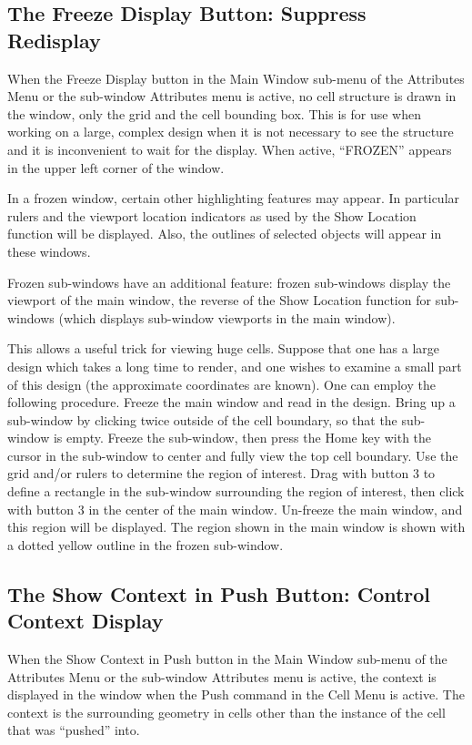 \subsection{The {\cb Freeze Display} Button: Suppress Redisplay}
When the {\cb Freeze Display} button in the {\cb Main Window} sub-menu
of the {\cb Attributes Menu} or the sub-window {\cb Attributes} menu is
active, no cell structure is drawn in the window, only the grid and
the cell bounding box.  This is for use when working on a large,
complex design when it is not necessary to see the structure and it is
inconvenient to wait for the display.  When active, ``FROZEN'' appears
in the upper left corner of the window.

In a frozen window, certain other highlighting features may appear. 
In particular rulers and the viewport location indicators as used by
the {\cb Show Location} function will be displayed.  Also, the
outlines of selected objects will appear in these windows.
    
Frozen sub-windows have an additional feature:  frozen sub-windows
display the viewport of the main window, the reverse of the {\cb Show
Location} function for sub-windows (which displays sub-window viewports
in the main window).

This allows a useful trick for viewing huge cells.  Suppose that one
has a large design which takes a long time to render, and one wishes
to examine a small part of this design (the approximate coordinates
are known).  One can employ the following procedure.  Freeze the main
window and read in the design.  Bring up a sub-window by clicking twice
outside of the cell boundary, so that the sub-window is empty.  Freeze
the sub-window, then press the {\kb Home} key with the cursor in the
sub-window to center and fully view the top cell boundary.  Use the
grid and/or rulers to determine the region of interest.  Drag with
button 3 to define a rectangle in the sub-window surrounding the region
of interest, then click with button 3 in the center of the main
window.  Un-freeze the main window, and this region will be displayed. 
The region shown in the main window is shown with a dotted yellow
outline in the frozen sub-window.


\subsection{The {\cb Show Context in Push} Button: Control Context Display}
When the {\cb Show Context in Push} button in the {\cb Main Window}
sub-menu of the {\cb Attributes Menu} or the sub-window {\cb
Attributes} menu is active, the context is displayed in the window
when the {\cb Push} command in the {\cb Cell Menu} is active.  The
context is the surrounding geometry in cells other than the instance
of the cell that was ``pushed'' into. 


